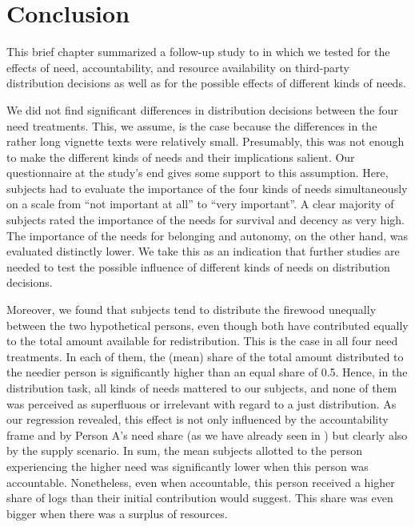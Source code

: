 \documentclass[egregdoesnotlikesansseriftitles]{scrartcl}
\begin{document}
\section{Conclusion}\label{sec:conclusion}
This brief chapter summarized a follow-up study to \cite{bauer_need_2020} in which we tested for the effects of need, accountability, and resource availability on third-party distribution decisions as well as for the possible effects of different kinds of needs.

We did not find significant differences in distribution decisions between the four need treatments.
This, we assume, is the case because the differences in the rather long vignette texts were relatively small.
Presumably, this was not enough to make the different kinds of needs and their implications salient.
Our questionnaire at the study's end gives some support to this assumption.
Here, subjects had to evaluate the importance of the four kinds of needs simultaneously on a scale from ``not important at all'' to ``very important''.
A clear majority of subjects rated the importance of the needs for survival and decency as very high.
The importance of the needs for belonging and autonomy, on the other hand, was evaluated distinctly lower.
We take this as an indication that further studies are needed to test the possible influence of different kinds of needs on distribution decisions.

Moreover, we found that subjects tend to distribute the firewood unequally between the two hypothetical persons, even though both have contributed equally to the total amount available for redistribution.
This is the case in all four need treatments.
In each of them, the (mean) share of the total amount distributed to the needier person is significantly higher than an equal share of 0.5.
Hence, in the distribution task, all kinds of needs mattered to our subjects, and none of them was perceived as superfluous or irrelevant with regard to a just distribution.
As our regression revealed, this effect is not only influenced by the accountability frame and by Person A's need share (as we have already seen in \citealt{bauer_need_2020}) but clearly also by the supply scenario.
In sum, the mean subjects allotted to the person experiencing the higher need was significantly lower when this person was accountable.
Nonetheless, even when accountable, this person received a higher share of logs than their initial contribution would suggest.
This share was even bigger when there was a surplus of resources.
\end{document}
